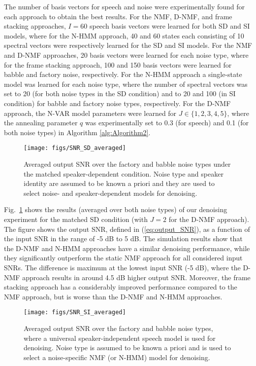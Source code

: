 \documentclass[10pt,twocolumn,twoside] {IEEEtran}
\begin{document}
The number of basis vectors for speech and noise were experimentally found for each approach to obtain the best results. For the NMF, D-NMF, and frame stacking approaches, $I=60$ speech basis vectors were learned for both SD and SI models, where for the N-HMM approach, 40 and 60 states each consisting of 10 spectral vectors were respectively learned for the SD and SI models. For the NMF and D-NMF approaches, 20 basis vectors were learned for each noise type, where for the frame stacking approach, 100 and 150 basis vectors were learned for babble and factory noise, respectively. For the N-HMM approach a single-state model was learned for each noise type, where the number of spectral vectors was set to 20 (for both noise types in the SD condition) and to 20 and 100 (in SI condition) for babble and factory noise types, respectively. For the D-NMF approach, the N-VAR model parameters were learned for $J\in\{1,2,3,4,5\}$, where the annealing parameter $q$ was experimentally set to 0.3 (for speech) and 0.1 (for both noise types) in Algorithm \ref{alg:Algorithm2}.

\begin{figure}
\texttt{[image: figs/SNR\_SD\_averaged]}
\caption{\label{fig:Results-of-denoisingSD} Averaged output SNR over the factory and babble noise types under the matched speaker-dependent condition. Noise type and speaker identity are assumed to be known a priori and they are used to select noise- and speaker-dependent models for denoising.}
\end{figure}

Fig.~\ref{fig:Results-of-denoisingSD} shows the results (averaged over both noise types) of our denoising
experiment for the matched SD condition (with $J=2$ for the D-NMF approach). The figure shows the output SNR, defined in (\ref{eq:output_SNR}),
as a function of the input SNR in the range of -5 dB to 5 dB. The simulation
results show that the D-NMF and N-HMM approaches have a similar denoising performance, while they significantly outperform the static NMF approach for
all considered input SNRs. The difference is maximum at the lowest input SNR (-5 dB), where the D-NMF approach results in around 4.5 dB higher output SNR. Moreover, the frame stacking approach has a considerably improved performance compared to the NMF approach, but is worse than the D-NMF and N-HMM approaches.


\begin{figure}
\texttt{[image: figs/SNR\_SI\_averaged]}
\caption{\label{fig:Results-of-denoisingSI} Averaged output SNR over the factory and babble noise types, where a universal speaker-independent speech model is used for denoising. Noise type is assumed to be known a priori and is used to select a noise-specific NMF (or N-HMM) model for denoising.}
\end{figure}
\end{document}
